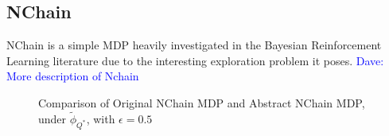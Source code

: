 \documentclass{article}
\newcommand{\ep}{\widetilde \phi}
\newcommand{\epQ}{\ep_{Q^*}}
\newcommand\dnote[1]{\textcolor{blue}{Dave: #1}}
\begin{document}
\subsection{NChain}

NChain is a simple MDP heavily investigated in the Bayesian Reinforcement Learning literature due to the interesting exploration problem it poses. \dnote{More description of Nchain}

\begin{figure}[h]
\label{fig:nchain-visual}
\caption{Comparison of Original NChain MDP and Abstract NChain MDP, under $\epQ$, with $\epsilon=0.5$}
\end{figure} 


%
%
\end{document}
